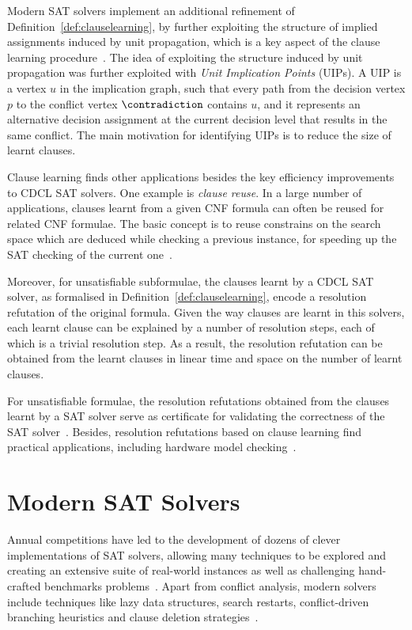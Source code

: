 Modern SAT solvers implement an additional refinement of
Definition~\ref{def:clauselearning}, by further exploiting the structure of
implied assignments induced by unit propagation, which is a key aspect of the
clause learning procedure~\cite{silva1997grasp}. The idea of exploiting the
structure induced by unit propagation was further exploited with \emph{Unit
Implication Points} (UIPs). A UIP is a vertex $u$ in the implication graph, such
that every path from the decision vertex $p$ to the conflict vertex $\contradiction$
contains $u$, and it represents an alternative decision assignment at the
current decision level that results in the same conflict. The main motivation
for identifying UIPs is to reduce the size of learnt clauses. 

Clause learning finds other applications besides the key efficiency improvements
to CDCL SAT solvers. One example is \emph{clause reuse}. In a large number of
applications, clauses learnt from a given CNF formula can often be reused for
related CNF formulae. The basic concept is to reuse constrains on the search
space which are deduced while checking a previous instance, for speeding up the
SAT checking of the current one~\cite{shtrichman2001pruning}.

Moreover, for unsatisfiable subformulae, the clauses learnt by a CDCL SAT
solver, as formalised in Definition~\ref{def:clauselearning}, encode a
resolution refutation of the original formula. Given the way clauses are learnt
in this solvers, each learnt clause can be explained by a number of resolution
steps, each of which is a trivial resolution step. As a result, the resolution
refutation can be obtained from the learnt clauses in linear time and space on
the number of learnt clauses. 

For unsatisfiable formulae, the resolution refutations obtained from the clauses
learnt by a SAT solver serve as certificate for validating the correctness of
the SAT solver~\cite{cdclchapter}. Besides, resolution refutations based on
clause learning find practical applications, including hardware model
checking~\cite{mcmillan2003interpolation}.

\section{Modern SAT Solvers}%

Annual competitions have led to the development of dozens of clever
implementations of SAT solvers, allowing many techniques to be explored and
creating an extensive suite of real-world instances as well as challenging
hand-crafted benchmarks problems~\cite{satchapter}. Apart from conflict
analysis, modern solvers include techniques like lazy data structures, search
restarts, conflict-driven branching heuristics and clause deletion
strategies~\cite{cdclchapter}.  

